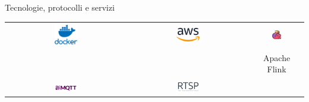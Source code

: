 \documentclass{beamer}
\begin{document}
\begin{frame}{Tecnologie, protocolli e servizi}
    \centering
    \begin{tabular}{ccc}
        \includegraphics[width=0.2\textwidth]{images/docker_logo.png} & 
        \includegraphics[width=0.2\textwidth]{images/aws_logo.png} & 
        \includegraphics[width=0.2\textwidth]{images/apache_flink_logo.jpeg} \\
         	& 	 & Apache Flink \\
        \vspace{0.5cm} \\ %
        \includegraphics[width=0.2\textwidth]{images/mqtt_logo.png} & 
        \includegraphics[width=0.2\textwidth]{images/rtsp_logo.png} \\ 
    \end{tabular}
\end{frame}

\end{document}
